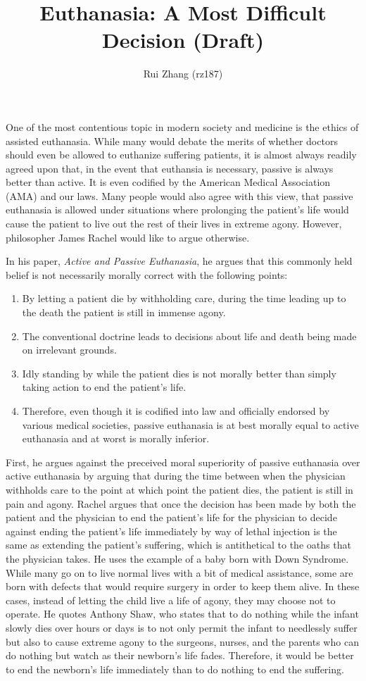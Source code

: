 \documentclass{article}
\begin{document}
\title{Euthanasia: A Most Difficult Decision (Draft)}
\author{Rui Zhang (rz187)}
\maketitle
One of the most contentious topic in modern society and medicine is the ethics of
assisted euthanasia. While many would debate the merits of whether doctors
should even be allowed to euthanize suffering patients, it is almost always readily
agreed upon that, in the event that euthansia is necessary, passive is
always better than active. It is even codified by the American Medical
Association (AMA) and our laws. Many people would also agree with this view, that passive
euthanasia is allowed under situations where prolonging the patient's life
would cause the patient to live out the rest of their lives in extreme
agony. However, philosopher James Rachel would like to argue otherwise.

In his paper, {\em Active and Passive Euthanasia}, he argues that this
commonly held belief is not necessarily morally correct with the following
points:
\begin{enumerate}
    \item By letting a patient die by withholding care, during the time leading up to the
    death the patient is still in immense agony.
    \item The conventional doctrine leads to decisions about life and death being made on irrelevant grounds.
    \item Idly standing by while the patient dies is not morally better than simply taking
    action to end the patient's life.
    \item Therefore, even though it is codified into law and officially endorsed by
    various medical societies, passive euthanasia is at best morally equal to active
    euthanasia and at worst is morally inferior.
\end{enumerate}

First, he argues against the preceived moral superiority of passive euthanasia over
active euthanasia by arguing that during the time between when the physician withholds
care to the point at which point the patient dies, the patient is still in pain and
agony. Rachel argues that once the decision has been made by both the patient and
the physician to end the patient's life for the physician to decide against ending the patient's
life immediately by way of lethal injection is the same as extending the patient's suffering,
which is antithetical to the oaths that the physician takes. He uses the example
of a baby born with Down Syndrome. While many go on to live normal lives with a
bit of medical assistance, some are born with defects that would require surgery in
order to keep them alive. In these cases, instead of letting the child live a life
of agony, they may choose not to operate. He quotes Anthony Shaw, who states that
to do nothing while the infant slowly dies over hours or days is to not only permit
the infant to needlessly suffer but also to cause extreme agony to the surgeons,
nurses, and the parents who can do nothing but watch as their newborn's life fades.
Therefore, it would be better to end the newborn's life immediately than to do nothing
to end the suffering.
\end{document}
